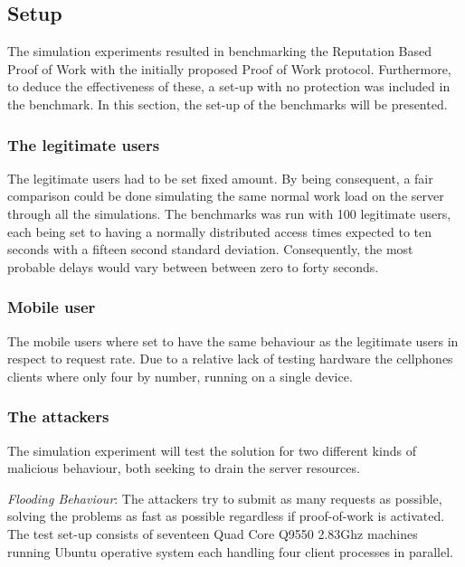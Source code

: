 

\subsection{Setup}
The simulation experiments resulted in benchmarking the Reputation Based Proof of Work with the initially proposed Proof of Work protocol. Furthermore, to deduce the effectiveness of these, a set-up with no protection was included in the benchmark. In this section, the set-up of the benchmarks will be presented.
\label{text:setup}
\subsubsection{The legitimate users} 
The legitimate users had to be set fixed amount. By being consequent, a fair comparison could be done simulating the same normal work load on the server through all the simulations. The benchmarks was run with 100 legitimate users, each being set to having a normally distributed access times expected to ten seconds with a fifteen second standard deviation. Consequently, the most probable delays would vary between between zero to forty seconds.
\\
\subsubsection{Mobile user}
The mobile users where set to have the same behaviour as the legitimate users in respect to request rate. Due to a relative lack of testing hardware the cellphones clients where only four by number, running on a single device. 
\\
\subsubsection{The attackers} 
The simulation experiment will test the solution for two different kinds of malicious behaviour, both seeking to drain the server resources.

\emph{Flooding Behaviour}: The attackers try to submit as many requests as possible, solving the problems as fast as possible regardless if proof-of-work is activated. The test set-up consists of seventeen Quad Core Q9550 2.83Ghz machines running Ubuntu operative system each handling four client processes in parallel.


